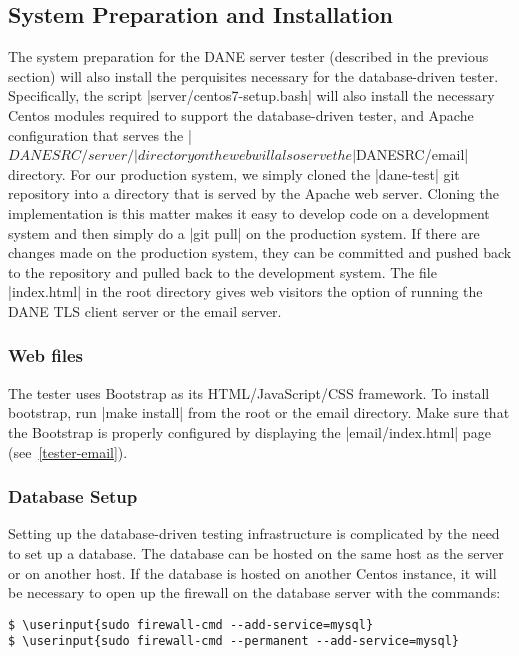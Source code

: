 \documentclass[preprint,3p,11pt]{elsarticle}
\newcommand\userinput[1]{\textbf{#1}}
\begin{document}
\subsection{System Preparation and Installation}
The system preparation for the DANE server tester (described in the
previous section) will also
install the perquisites necessary for the database-driven
tester. Specifically, the script |server/centos7-setup.bash| will also
install the necessary 
Centos modules required to support the database-driven tester, and
Apache configuration that serves the |$DANESRC/server/| directory on
the web will also serve the |$DANESRC/email| directory. For our
production system, we simply cloned the |dane-test| git repository
into a directory that is served by the Apache web server. Cloning the
implementation is this matter makes it easy to develop code on a
development system and then simply do a |git pull| on the production
system. If there are changes made on the production system, they can
be committed and pushed back to the repository and pulled back to the
development system. The file
|index.html| in the root directory gives web visitors the option of
running the DANE TLS client server or the email server. 

\subsubsection{Web files}

The tester uses Bootstrap as its HTML/JavaScript/CSS framework. To
install bootstrap, run |make install| from the root or the email directory. Make
sure that the Bootstrap is properly configured by displaying the
|email/index.html| page (see~\ref{tester-email}).




\subsubsection{Database Setup}

Setting up the database-driven testing infrastructure is complicated
by the need to set up a database. The database can be hosted on the
same host as the server or on another host. If the database is hosted
on another Centos instance, it will be necessary to open up the
firewall on the database server with the commands:

\begin{Verbatim}[commandchars=\\\{\},fontsize=\small]
$ \userinput{sudo firewall-cmd --add-service=mysql}
$ \userinput{sudo firewall-cmd --permanent --add-service=mysql}
\end{Verbatim}
\end{document}
